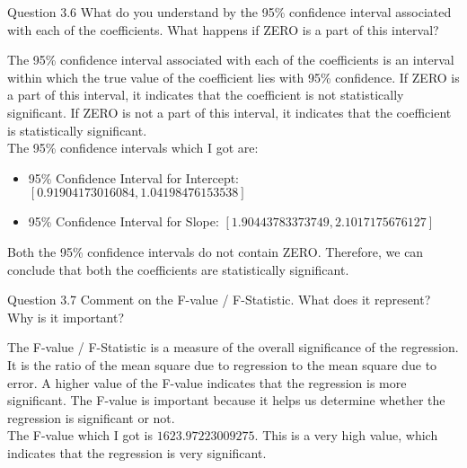 \vspace{10mm}

\begin{custombox}[label={box:Q3.6}]{Question 3.6}
	What do you understand by the 95\% confidence interval associated with each of the coefficients. What happens if ZERO is a part of this interval?
\end{custombox}

The 95\% confidence interval associated with each of the coefficients is an interval within which the true value of the coefficient lies with 95\% confidence. If ZERO is a part of this interval, it indicates that the coefficient is not statistically significant. If ZERO is not a part of this interval, it indicates that the coefficient is statistically significant. \\

The 95\% confidence intervals which I got are:

\begin{itemize}
	\item 95\% Confidence Interval for Intercept: $[0.91904173016084, 1.04198476153538]$
	\item 95\% Confidence Interval for Slope: $[1.90443783373749, 2.1017175676127]$
\end{itemize}

Both the 95\% confidence intervals do not contain ZERO. Therefore, we can conclude that both the coefficients are statistically significant.

\vspace{10mm}

\begin{custombox}[label={box:Q3.7}]{Question 3.7}
	Comment on the F-value / F-Statistic. What does it represent? Why is it important?
\end{custombox}

The F-value / F-Statistic is a measure of the overall significance of the regression. It is the ratio of the mean square due to regression to the mean square due to error. A higher value of the F-value indicates that the regression is more significant. The F-value is important because it helps us determine whether the regression is significant or not. \\

The F-value which I got is $1623.97223009275$. This is a very high value, which indicates that the regression is very significant.

\clearpage